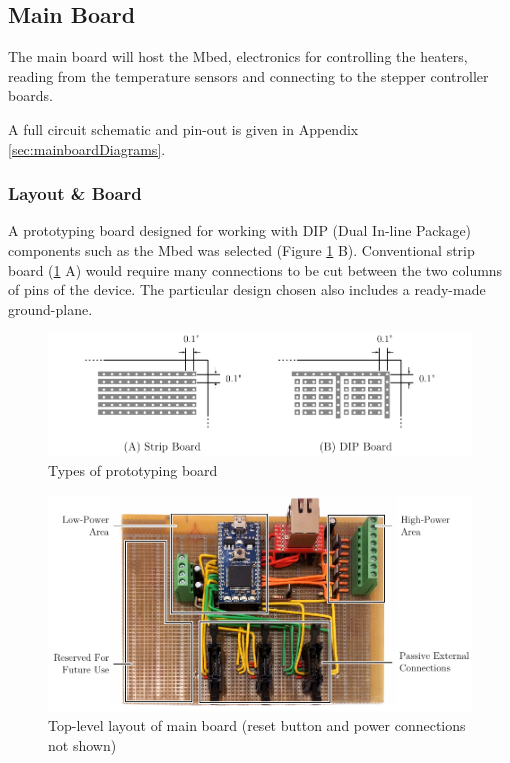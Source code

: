		\subsection{Main Board}
			
			The main board will host the Mbed, electronics for controlling the
			heaters, reading from the temperature sensors and connecting to the
			stepper controller boards.
			
			A full circuit schematic and pin-out is given in Appendix
			\ref{sec:mainboardDiagrams}.
			
			\subsubsection{Layout \& Board}
				
				A prototyping board designed for working with DIP (Dual In-line Package)
				components such as the Mbed was selected (Figure \ref{fig:dipBoard} B).
				Conventional strip board (\ref{fig:dipBoard} A) would require many
				connections to be cut between the two columns of pins of the device. The
				particular design chosen also includes a ready-made ground-plane.
				
				\begin{figure}
					\includegraphics[width=1\textwidth]{diagrams/dipBoard.pdf}
					\caption{Types of prototyping board}
					\label{fig:dipBoard}
				\end{figure}
				
				\begin{figure}
					\includegraphics[width=1\textwidth]{diagrams/mainBoard.pdf}
					\caption{Top-level layout of main board (reset button and power
					         connections not shown)}
					\label{fig:mainBoard}
				\end{figure}
				
